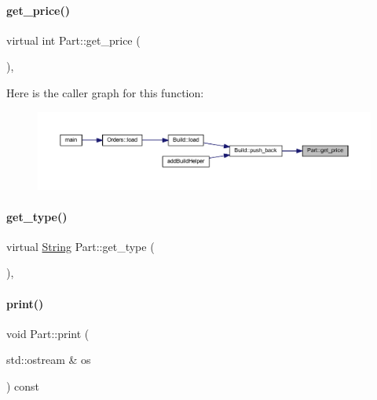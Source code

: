 \paragraph{\texorpdfstring{get\_price()}{get\_price()}}
{\footnotesize\ttfamily virtual int Part\+::get\+\_\+price (\begin{DoxyParamCaption}{ }\end{DoxyParamCaption})\hspace{0.3cm}{\ttfamily [inline]}, {\ttfamily [virtual]}}

Here is the caller graph for this function\+:
\nopagebreak
\begin{figure}[H]
\begin{center}
\leavevmode
\includegraphics[width=350pt]{class_part_a38bcd0481433acc24db7d5f978f2c839_icgraph}
\end{center}
\end{figure}
\mbox{\label{class_part_a02569fd3cf6c52b56baceed5d639f487}} 
\paragraph{\texorpdfstring{get\_type()}{get\_type()}}
{\footnotesize\ttfamily virtual \mbox{\hyperlink{class_string}{String}} Part\+::get\+\_\+type (\begin{DoxyParamCaption}{ }\end{DoxyParamCaption})\hspace{0.3cm}{\ttfamily [inline]}, {\ttfamily [virtual]}}

\mbox{\label{class_part_a4fa402b8e8fd4236ff773a7697ab2bc3}} 
\paragraph{\texorpdfstring{print()}{print()}\hspace{0.1cm}{\footnotesize\ttfamily [1/4]}}
{\footnotesize\ttfamily void Part\+::print (\begin{DoxyParamCaption}\item[{std\+::ostream \&}]{os }\end{DoxyParamCaption}) const\hspace{0.3cm}{\ttfamily [virtual]}}



